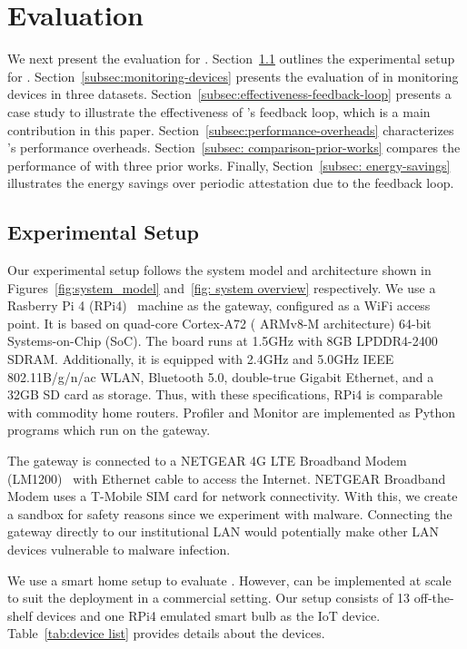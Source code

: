 \section{Evaluation}\label{sec: Evaluation}
We next present the evaluation for \system{}.  
Section~\ref{subsec:experimental-setup} outlines the experimental setup for \system{}.
Section~\ref{subsec:monitoring-devices} presents the evaluation of \system{} in monitoring devices in three datasets.
Section~\ref{subsec:effectiveness-feedback-loop} presents a case study to illustrate the effectiveness of \system{}'s feedback loop, which is a main contribution in this paper.
Section~\ref{subsec:performance-overheads} characterizes \system{}'s performance overheads.
Section~\ref{subsec: comparison-prior-works} compares the performance of \system{} with three prior works. Finally, Section~\ref{subsec: energy-savings} illustrates the energy savings over periodic attestation due to the feedback loop.
\subsection{Experimental Setup}\label{subsec:experimental-setup}
Our experimental setup follows the \system{} system model and architecture shown in Figures~\ref{fig:system_model} and~\ref{fig: system overview} respectively. We use a Rasberry Pi 4 (RPi4)~\cite{raspberry_pi4} machine as the gateway, configured as a WiFi access point. It is based on quad-core Cortex-A72 (\ie{} ARMv8-M architecture) 64-bit Systems-on-Chip (SoC). The board runs at 1.5GHz with 8GB LPDDR4-2400 SDRAM. Additionally, it is equipped with 2.4GHz and 5.0GHz IEEE 802.11B/g/n/ac WLAN, Bluetooth 5.0, double-true Gigabit Ethernet, and a 32GB SD card as storage. Thus, with these specifications, RPi4 is comparable with commodity home routers. Profiler and Monitor are implemented as Python programs which run on the gateway.

The gateway is connected to a NETGEAR 4G LTE Broadband Modem (LM1200)~\cite{netgear_modem} with Ethernet cable to access the Internet. NETGEAR Broadband Modem uses a T-Mobile SIM card for network connectivity. With this, we create a sandbox for safety reasons since we experiment with malware. Connecting the gateway directly to our institutional LAN would potentially make other LAN devices vulnerable to malware infection. 

We use a smart home setup to evaluate \system{}. However, \system{} can be implemented at scale to suit the deployment in a commercial setting. Our setup consists of 13 off-the-shelf devices and one RPi4 emulated smart bulb as the IoT device. 
Table~\ref{tab:device list} provides details about the devices. 

